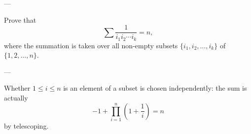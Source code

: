 
---

Prove that \[\sum\frac1{i_1i_2\cdots i_k}=n,\]
where the summation is taken over all non-empty subsets $\{i_1,i_2,\ldots,i_k\}$ of $\{1,2,\ldots,n\}$.

---

Whether $1\le i\le n$ is an element of a subset is chosen independently: the sum is actually \[-1+\prod_{i=1}^n\left(1+\frac1i\right)=n\]
by telescoping.
